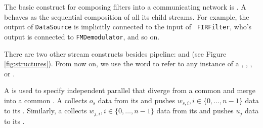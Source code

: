 


The basic construct for composing filters into a communicating
network is \pipeline.  A \pipeline behaves as the sequential
composition of all its child streams.  For example, the output of
{\tt DataSource} is implicitly connected to the input of {\tt
FIRFilter}, who's output is connected to {\tt FMDemodulator}, and
so on.

There are two other stream constructs besides pipeline: \splitjoin
and \feedbackloop (see Figure \ref{fig:structures}). From now on,
we use the word \stream to refer to any instance of a \filter,
\pipeline, \splitjoin, or \feedbackloop.

A \splitjoin is used to specify independent parallel \streams that
diverge from a common {\splitter} and merge into a common
{\joiner}. A \splitter collects $o_s$ data from its \Input
\Channel and pushes $w_{s,i}, i \in \{0,\dots,n-1\}$ data to its
\Output \Channels. Similarly, a \joiner collects $w_{j,i}, i \in
\{0,\dots,n-1\}$ data from its \Input \Channel and pushes $u_j$
data to its \Output \Channel.

\begin{comment}
There are two kinds of \splitters: 1) \duplicate, which replicates
each data item and sends a copy to each parallel \stream, and 2)
\roundrobin$(w_0, \dots, w_{n-1})$, which sends the first $w_0$
items to the first \stream, the next $w_1$ items to the second
\stream, and so on.  \roundrobin is also the only type of \joiner
that we support; its function is analogous to a \roundrobin
\splitter.  If a \roundrobin is written without any weights, we
assume that all $w_i = 1$. The \splitter and \joiner type are
specified with the keywords {\tt split} and {\tt join},
respectively (see Figure \ref{fig:radiocode}); the parallel
streams are specified by successive calls to {\tt add}, with the
$i$'th call setting the $i$'th stream in the splitjoin.
\end{comment}

